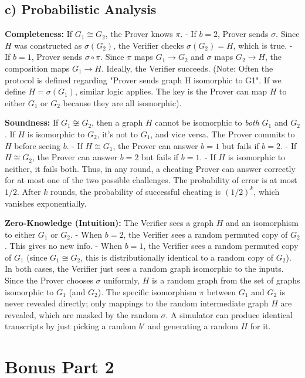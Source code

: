 \documentclass[11pt]{article}
\begin{document}
\subsection*{c) Probabilistic Analysis}

\textbf{Completeness:}
If $G_1 \cong G_2$, the Prover knows $\pi$.
- If $b=2$, Prover sends $\sigma$. Since $H$ was constructed as $\sigma(G_2)$, the Verifier checks $\sigma(G_2) = H$, which is true.
- If $b=1$, Prover sends $\sigma \circ \pi$. Since $\pi$ maps $G_1 \to G_2$ and $\sigma$ maps $G_2 \to H$, the composition maps $G_1 \to H$. Ideally, the Verifier succeeds.
(Note: Often the protocol is defined regarding "Prover sends graph H isomorphic to G1". If we define $H = \sigma(G_1)$, similar logic applies. The key is the Prover can map $H$ to either $G_1$ or $G_2$ because they are all isomorphic).

\textbf{Soundness:}
If $G_1 \allowbreak \not\cong G_2$, then a graph $H$ cannot be isomorphic to \textit{both} $G_1$ and $G_2$. If $H$ is isomorphic to $G_2$, it's not to $G_1$, and vice versa.
The Prover commits to $H$ before seeing $b$.
- If $H \cong G_1$, the Prover can answer $b=1$ but fails if $b=2$.
- If $H \cong G_2$, the Prover can answer $b=2$ but fails if $b=1$.
- If $H$ is isomorphic to neither, it fails both.
Thus, in any round, a cheating Prover can answer correctly for at most one of the two possible challenges. The probability of error is at most $1/2$.
After $k$ rounds, the probability of successful cheating is $(1/2)^k$, which vanishes exponentially.

\textbf{Zero-Knowledge (Intuition):}
The Verifier sees a graph $H$ and an isomorphism to either $G_1$ or $G_2$.
- When $b=2$, the Verifier sees a random permuted copy of $G_2$. This gives no new info.
- When $b=1$, the Verifier sees a random permuted copy of $G_1$ (since $G_1 \cong G_2$, this is distributionally identical to a random copy of $G_2$).
In both cases, the Verifier just sees a random graph isomorphic to the inputs. Since the Prover chooses $\sigma$ uniformly, $H$ is a random graph from the set of graphs isomorphic to $G_1$ (and $G_2$). The specific isomorphism $\pi$ between $G_1$ and $G_2$ is never revealed directly; only mappings to the random intermediate graph $H$ are revealed, which are masked by the random $\sigma$. A simulator can produce identical transcripts by just picking a random $b'$ and generating a random $H$ for it.

\newpage

\section*{Bonus Part 2}
\end{document}
